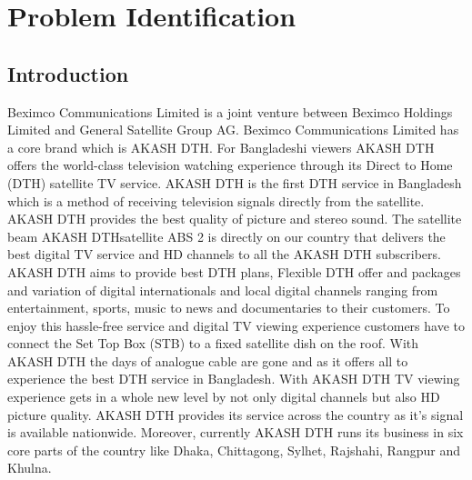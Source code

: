 \chapter{Problem Identification}
\begin{spacing}{1.5}
\setlength{\parskip}{0.3in}

\section{Introduction}
Beximco Communications Limited is a joint venture between Beximco Holdings Limited and General Satellite Group AG. Beximco Communications Limited has a core brand which is AKASH DTH. For Bangladeshi viewers AKASH DTH offers the world-class television watching experience through its Direct to Home (DTH) satellite TV service. AKASH DTH is the first DTH service in Bangladesh which is a method of receiving television signals directly from the satellite. AKASH DTH provides the best quality of picture and stereo sound. The satellite beam AKASH DTHsatellite ABS 2 is directly on our country that delivers the best digital TV service and HD channels to all the AKASH DTH subscribers. AKASH DTH aims to provide best DTH plans, Flexible DTH offer and packages and variation of digital internationals and local digital channels ranging from entertainment, sports, music to news and documentaries to their customers. To enjoy this hassle-free service and digital TV viewing experience customers have to connect the Set Top Box (STB) to a fixed satellite dish on the roof. With AKASH DTH the days of analogue cable are gone and as it offers all to experience the best DTH service in Bangladesh. With AKASH DTH TV viewing experience gets in a whole new level by not only digital channels but also HD picture quality. AKASH DTH provides its service across the country as it’s signal is available nationwide. Moreover, currently AKASH DTH runs its business in six core parts of the country like Dhaka, Chittagong, Sylhet, Rajshahi, Rangpur and Khulna.

\end{spacing}
